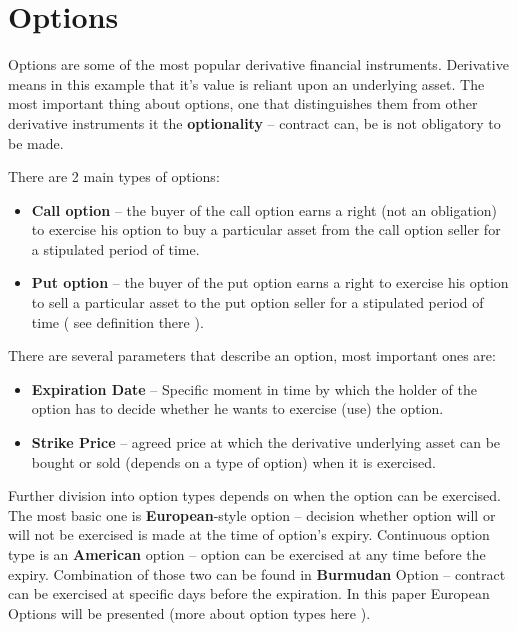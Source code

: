 \section{Options}
    Options are some of the most popular derivative financial instruments. Derivative means in this example that it's value is reliant upon an underlying asset. The most important thing about options, one that distinguishes them from other derivative instruments it the \textbf{optionality} -- contract can, be is not obligatory to be made.
    
    There are 2 main types of options:
    \begin{itemize}
        \item \textbf{Call option} -- the buyer of the call option earns a right (not an obligation) to exercise his option to buy a particular asset from the call option seller for a stipulated period of time.
        \item \textbf{Put option} -- the buyer of the put option earns a right to exercise his option to sell a particular asset to the put option seller for a stipulated period of time ( see definition there \cite{Call_Put_Option_Definition}).
    \end{itemize}
    
    There are several parameters that describe an option, most important ones are:
    \begin{itemize}
        \item \textbf{Expiration Date} -- Specific moment in time by which the holder of the option has to decide whether he wants to exercise (use) the option.
        \item \textbf{Strike Price} -- agreed price at which the derivative underlying asset can be bought or sold (depends on a type of option) when it is exercised.
    \end{itemize}
    Further division into option types depends on when the option can be exercised. The most basic one is \textbf{European}-style option -- decision whether option will or will not be exercised is made at the time of option's expiry. Continuous option type is an \textbf{American} option -- option can be exercised at any time before the expiry. Combination of those two can be found in \textbf{Burmudan} Option -- contract can be exercised at specific days before the expiration. In this paper European Options will be presented (more about option types here \cite{Option_Types}).
    
